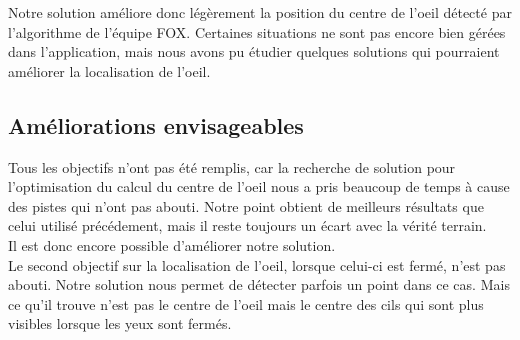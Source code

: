Notre solution améliore donc légèrement la position du centre de l'oeil détecté par l'algorithme de l'équipe FOX. Certaines
situations ne sont pas encore bien gérées dans l'application, mais nous avons pu étudier quelques solutions qui pourraient améliorer
la localisation de l'oeil.

\subsection{Améliorations envisageables}
Tous les objectifs n'ont pas été remplis, car la recherche de solution pour l'optimisation du calcul du centre de l'oeil
nous a pris beaucoup de temps à cause des pistes qui n'ont pas abouti. Notre point obtient de meilleurs résultats
que celui utilisé précédement, mais il reste toujours un écart avec la vérité terrain. \\Il est donc encore possible
d'améliorer notre solution.\\

Le second objectif sur la localisation de l'oeil, lorsque celui-ci est fermé, n'est pas abouti. Notre solution
nous permet de détecter parfois un point dans ce cas. Mais ce qu'il trouve n'est pas le centre de l'oeil mais le
centre des cils qui sont plus visibles lorsque les yeux sont fermés.
